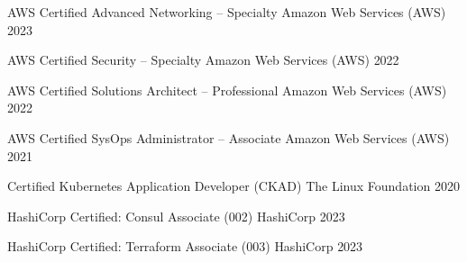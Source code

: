

\begin{cvhonors}

  \cvhonor
    {AWS Certified Advanced Networking – Specialty} %
    {Amazon Web Services (AWS)} %
    {} %
    {2023} %

  \cvhonor
    {AWS Certified Security – Specialty} %
    {Amazon Web Services (AWS)} %
    {} %
    {2022} %

  \cvhonor
    {AWS Certified Solutions Architect – Professional} %
    {Amazon Web Services (AWS)} %
    {} %
    {2022} %

  \cvhonor
    {AWS Certified SysOps Administrator – Associate} %
    {Amazon Web Services (AWS)} %
    {} %
    {2021} %

  \cvhonor
    {Certified Kubernetes Application Developer (CKAD)} %
    {The Linux Foundation} %
    {} %
    {2020} %

  \cvhonor
    {HashiCorp Certified: Consul Associate (002)} %
    {HashiCorp} %
    {} %
    {2023} %

  \cvhonor
    {HashiCorp Certified: Terraform Associate (003)} %
    {HashiCorp} %
    {} %
    {2023} %

\end{cvhonors}
